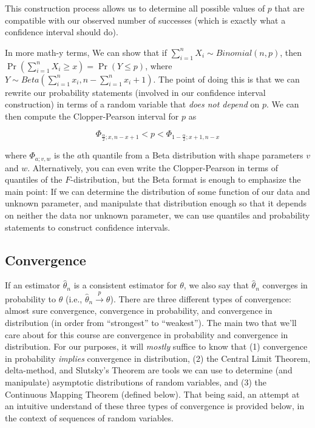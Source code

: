 \documentclass[
  letterpaper,
  DIV=11,
  numbers=noendperiod]{scrreprt}
\begin{document}
This construction process allows us to determine all possible values of
\(p\) that are compatible with our observed number of successes (which
is exactly what a confidence interval should do).

In more math-y terms, We can show that if
\(\sum_{i = 1}^n X_i \sim Binomial(n, p)\), then
\(\Pr(\sum_{i = 1}^n X_i \geq x) = \Pr(Y \leq p)\), where
\(Y \sim Beta(\sum_{i = 1}^n x_i, n - \sum_{i = 1}^n x_i + 1)\). The
point of doing this is that we can rewrite our probability statements
(involved in our confidence interval construction) in terms of a random
variable that \emph{does not depend} on \(p\). We can then compute the
Clopper-Pearson interval for \(p\) as

\[
\Phi_{\frac{\alpha}{2}; x, n - x + 1} < p < \Phi_{1 - \frac{\alpha}{2}; x + 1, n - x}
\]

where \(\Phi_{a; v, w}\) is the \(a\)th quantile from a Beta
distribution with shape parameters \(v\) and \(w\). Alternatively, you
can even write the Clopper-Pearson in terms of quantiles of the
\(F\)-distribution, but the Beta format is enough to emphasize the main
point: If we can determine the distribution of some function of our data
and unknown parameter, and manipulate that distribution enough so that
it depends on neither the data nor unknown parameter, we can use
quantiles and probability statements to construct confidence intervals.

\subsection*{Convergence}\label{convergence}

If an estimator \(\hat{\theta}_n\) is a consistent estimator for
\(\theta\), we also say that \(\hat{\theta}_n\) converges in probability
to \(\theta\) (i.e., \(\hat{\theta}_n \overset{p}{\to} \theta\)). There
are three different types of convergence: almost sure convergence,
convergence in probability, and convergence in distribution (in order
from ``strongest'' to ``weakest''). The main two that we'll care about
for this course are convergence in probability and convergence in
distribution. For our purposes, it will \emph{mostly} suffice to know
that (1) convergence in probability \emph{implies} convergence in
distribution, (2) the Central Limit Theorem, delta-method, and Slutsky's
Theorem are tools we can use to determine (and manipulate) asymptotic
distributions of random variables, and (3) the Continuous Mapping
Theorem (defined below). That being said, an attempt at an intuitive
understand of these three types of convergence is provided below, in the
context of sequences of random variables.
\end{document}
